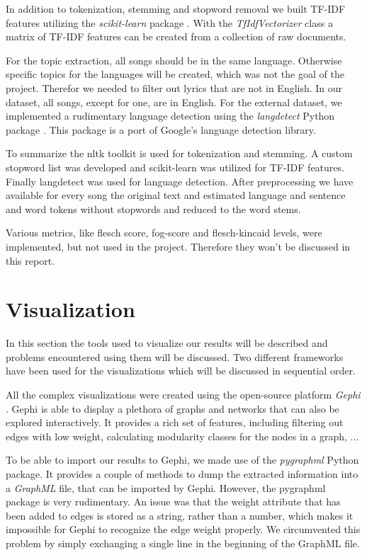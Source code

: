 \documentclass[10pt,a4paper]{article}
\begin{document}
	In addition to tokenization, stemming and stopword removal we built TF-IDF features utilizing the \textit{scikit-learn} package \cite{scikit-learn}. With the \textit{TfIdfVectorizer} class a matrix of TF-IDF features can be created from a collection of raw documents. 
	
	For the topic extraction, all songs should be in the same language. Otherwise specific topics for the languages will be created, which was not the goal of the project. Therefor we needed to filter out lyrics that are not in English.  
	In our dataset, all songs, except for one, are in English. For the external dataset, we implemented a rudimentary language detection using the \textit{langdetect} Python package \cite{langdetect}. This package is a port of Google's language detection library.
	
	To summarize the nltk toolkit is used for tokenization and stemming. A custom stopword list was developed and scikit-learn was utilized for TF-IDF features. Finally langdetect was used for language detection. After preprocessing we have available for every song the original text and estimated language and sentence and word tokens without stopwords and reduced to the word stems.
	
	Various metrics, like flesch score, fog-score and flesch-kincaid levels, were implemented, but not used in the project. Therefore they won't be discussed in this report.
	
	\section{Visualization}
	\label{sec:visualization}
	In this section the tools used to visualize our results will be described and problems encountered using them will be discussed. Two different frameworks have been used for the visualizations which will be discussed in sequential order.
	
	All the complex visualizations were created using the open-source platform \textit{Gephi} \cite{ICWSM09154}. Gephi is able to display a plethora of graphs and networks that can also be explored interactively. It provides a rich set of features, including filtering out edges with low weight, calculating modularity classes for the nodes in a graph, ... %
	
	To be able to import our results to Gephi, we made use of the \textit{pygraphml} Python package. It provides a couple of methods to dump the extracted information into a \textit{GraphML} file, that can be imported by Gephi. However, the pygraphml package is very rudimentary. An issue was that the weight attribute that has been added to edges is stored as a string, rather than a number, which makes it impossible for Gephi to recognize the edge weight properly. We circumvented this problem by simply exchanging a single line in the beginning of the GraphML file.
	
\end{document}
